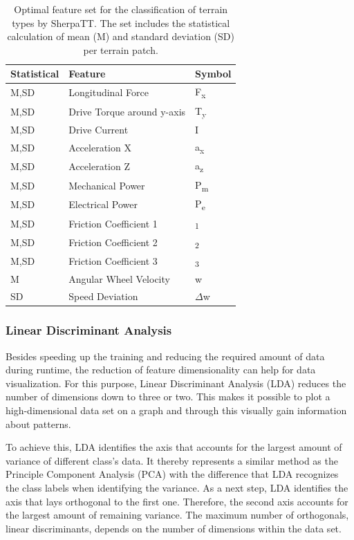 \documentclass{article}
\begin{document}
\begin{table}[htb!]
   \centering
    \caption{Optimal feature set for the classification of terrain types by SherpaTT. The set includes the statistical calculation of mean (M) and standard deviation (SD) per terrain patch.\label{fig:optiF}}
    \begin{tabularx}{\columnwidth}{XXX}
    \textbf{Statistical} & \textbf{Feature}  & \textbf{Symbol} \\
    \hline
     M,SD	&  Longitudinal Force	 & F\textsubscript{x} \\ 
     M,SD	&  Drive Torque	around y-axis  & T\textsubscript{y} \\ 
     M,SD	&  Drive Current	 & I \\  
     M,SD	&  Acceleration X	 &  a\textsubscript{x}\\ 
     M,SD	&  Acceleration Z	 & a\textsubscript{z} \\ 
     M,SD	&  Mechanical Power	 & P\textsubscript{m} \\ 
     M,SD	&  Electrical Power	 & P\textsubscript{e} \\ 
     M,SD	&  Friction Coefficient 1	 & \textmu \textsubscript{1} \\ 
     M,SD	&  Friction Coefficient 2 & \textmu \textsubscript{2}\\ 
     M,SD	&  Friction Coefficient 3	 & \textmu \textsubscript{3}\\ 
     M	    &  Angular Wheel Velocity	     &  w      \\ 
     SD    	&  Speed Deviation	 & $\Delta$w\\ 
    \end{tabularx}	
\end{table}

\subsubsection{Linear Discriminant Analysis}
Besides speeding up the training and reducing the required amount of data during runtime, the reduction of feature dimensionality can help for data visualization. For this purpose, Linear Discriminant Analysis (LDA) reduces the number of dimensions down to three or two. This makes it possible to plot a high-dimensional data set on a graph and through this visually gain information about patterns. 

To achieve this, LDA identifies the axis that accounts for the largest amount of variance of different class's data. It thereby represents a similar method as the Principle Component Analysis (PCA) with the difference that LDA recognizes the class labels when identifying the variance. As a next step, LDA identifies the axis that lays orthogonal to the first one. Therefore, the second axis accounts for the largest amount of remaining variance. The maximum number of orthogonals, linear discriminants, depends on the number of dimensions within the data set.\cite{kuhr2021}
\end{document}

